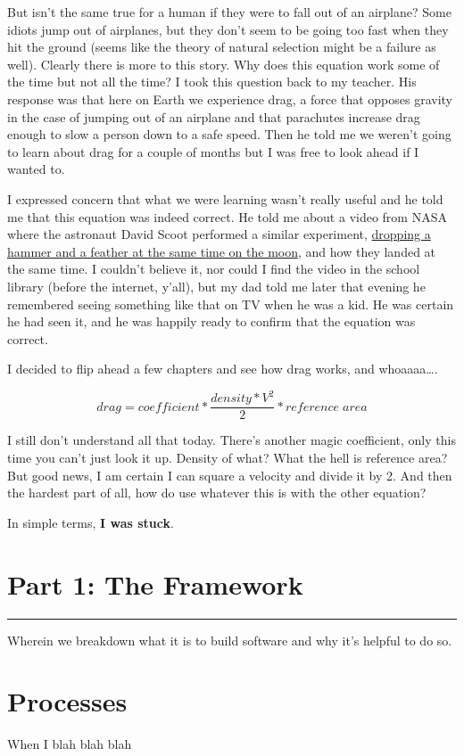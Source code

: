 \documentclass[]{book}
\begin{document}
But isn't the same true for a human if they were to fall out of an
airplane? Some idiots jump out of airplanes, but they don't seem to be
going too fast when they hit the ground (seems like the theory of
natural selection might be a failure as well). Clearly there is more to
this story. Why does this equation work some of the time but not all the
time? I took this question back to my teacher. His response was that
here on Earth we experience drag, a force that opposes gravity in the
case of jumping out of an airplane and that parachutes increase drag
enough to slow a person down to a safe speed. Then he told me we weren't
going to learn about drag for a couple of months but I was free to look
ahead if I wanted to.

I expressed concern that what we were learning wasn't really useful and
he told me that this equation was indeed correct. He told me about a
video from NASA where the astronaut David Scoot performed a similar
experiment,
\href{https://nssdc.gsfc.nasa.gov/planetary/lunar/apollo_15_feather_drop.html}{dropping
a hammer and a feather at the same time on the moon}, and how they
landed at the same time. I couldn't believe it, nor could I find the
video in the school library (before the internet, y'all), but my dad
told me later that evening he remembered seeing something like that on
TV when he was a kid. He was certain he had seen it, and he was happily
ready to confirm that the equation was correct.

I decided to flip ahead a few chapters and see how drag works, and
whoaaaa\ldots{}.

\[drag = coefficient * \frac{density * V^2}{2} * reference\;area\]

I still don't understand all that today. There's another magic
coefficient, only this time you can't just look it up. Density of what?
What the hell is reference area? But good news, I am certain I can
square a velocity and divide it by 2. And then the hardest part of all,
how do use whatever this is with the other equation?

In simple terms, \textbf{I was stuck}.

\chapter*{Part 1: The Framework}\label{part1}

\begin{center}\rule{0.5\linewidth}{0.5pt}\end{center}

Wherein we breakdown what it is to build software and why it's helpful
to do so.

\chapter{Processes}\label{processes}

When I blah blah blah


\end{document}
